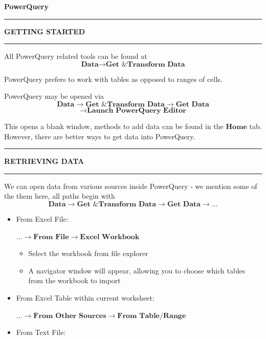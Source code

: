 \documentclass[8pt]{extarticle}
\newcommand{\heading}[1]{%
    \noindent
    \rule{\linewidth}{0.4pt}
    \begin{center}
        \vspace{-1ex}
        \textbf{#1}        
        \vspace{-2.5ex}
    \end{center}
    \rule{\linewidth}{0.4pt}
}
\begin{document}

\newpage
\thispagestyle{empty} 
\begin{center}   
{\huge\textbf{PowerQuery}}\\
\vspace*{0.75cm}
\end{center}

\begin{multicols}{3}
\setlength{\columnseprule}{1pt} %

\heading{GETTING STARTED}

All PowerQuery related tools can be found at 
\[\textbf{Data} \rightarrow \textbf{Get \& Transform Data} \]

PowerQuery prefers to work with tables as opposed to ranges of cells.

PowerQuery may be opened via 
\[\textbf{Data} \rightarrow \textbf{Get \& Transform Data} \rightarrow \textbf{Get Data} \]
\[\rightarrow \textbf{Launch PowerQuery Editor}\]

This opens a blank window, methods to add data can be found in the $\textbf{Home}$ tab. However, there are better ways to get data into PowerQuery.

\heading{RETRIEVING DATA}

We can open data from various sources inside PowerQuery - we mention some of the them here, all paths begin with 
\[\textbf{Data} \rightarrow \textbf{Get \& Transform Data} \rightarrow \textbf{Get Data} \rightarrow \dots\]
\begin{itemize}
    \item  From Excel File:
    
    $\dots \rightarrow \textbf{From File} \rightarrow \textbf{Excel Workbook}$
    \begin{itemize}
        \item Select the workbook from file explorer
        \item A navigator window will appear, allowing you to choose which tables from the workbook to import
    \end{itemize}
    \item From Excel Table within current worksheet:
    
    $\dots \rightarrow \textbf{From Other Sources} \rightarrow \textbf{From Table/Range}$
    \item From Text File:


\end{itemize}
\end{multicols}
\end{document}
